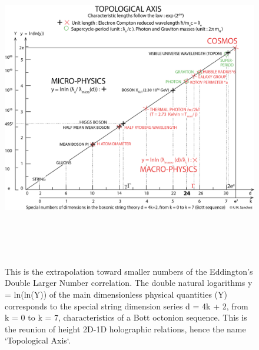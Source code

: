 \documentclass[a4paper,9pt]{article}
\begin{document}
\begin{appendix}
\begin{table}
\begin{tabular}{llll}
    \bottomrule
  \end{tabular}
\end{table}


% 

\begin{figure}
\label{tab:8:table8}
\centering
\includegraphics[width=\textwidth,height=14cm]{./figure/figure}
\caption[The Topological Axis]
{This is the extrapolation toward smaller numbers of the Eddington's Double Larger Number correlation. The double natural logarithms y = ln(ln(Y)) of the main dimensionless physical quantities (Y) corresponds to the special string dimension series d = 4k + 2, from k = 0 to k = 7, characteristics of a Bott octonion sequence. This is the reunion of height 2D-1D holographic relations, hence the name `Topological Axis`.}

\end{figure}
\end{appendix}
\end{document}
